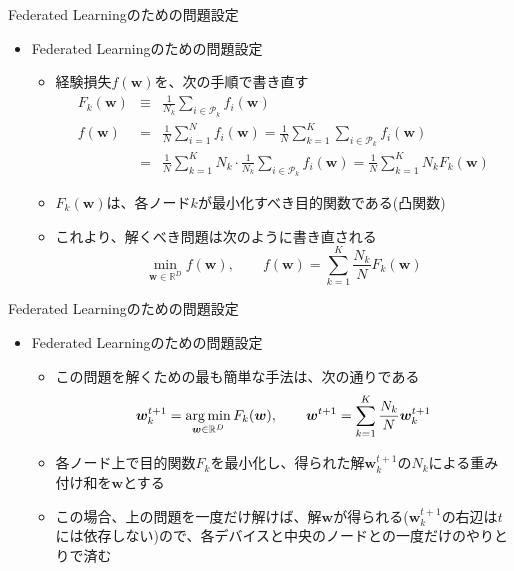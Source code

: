 \documentclass[dvipdfmx,notheorems,t]{beamer}
\begin{document}
\begin{frame}{Federated Learningのための問題設定}

\begin{itemize}
	\item Federated Learningのための問題設定
	\begin{itemize}
		\item 経験損失$f(\bm{w})$を、次の手順で書き直す
		\begin{eqnarray}
			F_k(\bm{w}) &\equiv& \frac{1}{N_k} \sum_{i \in \mathcal{P}_k} f_i(\bm{w}) \\
			f(\bm{w}) &=& \frac{1}{N} \sum_{i = 1}^N f_i(\bm{w}) = \frac{1}{N} \sum_{k = 1}^K \sum_{i \in \mathcal{P}_k} f_i(\bm{w}) \nonumber \\
			&=& \frac{1}{N} \sum_{k = 1}^K N_k \cdot \frac{1}{N_k} \sum_{i \in \mathcal{P}_k} f_i(\bm{w}) = \frac{1}{N} \sum_{k = 1}^K N_k F_k(\bm{w})
		\end{eqnarray}
		
		\item $F_k(\bm{w})$は、各ノード$k$が最小化すべき目的関数である(凸関数)
		\item これより、解くべき問題は次のように書き直される
		\begin{equation}
			\min_{\bm{w} \in \mathbb{R}^D} f(\bm{w}), \qquad f(\bm{w}) = \sum_{k = 1}^K \frac{N_k}{N} F_k(\bm{w})
		\end{equation}
	\end{itemize}
\end{itemize}

\end{frame}

\begin{frame}{Federated Learningのための問題設定}

\begin{itemize}
	\item Federated Learningのための問題設定
	\begin{itemize}
		\item この問題を解くための最も簡単な手法は、次の通りである
		\begin{equation}
			\bm{w}_k^{t + 1} = \operatorname*{arg\,min}_{\bm{w} \in \mathbb{R}^D} F_k(\bm{w}), \qquad \bm{w}^{t + 1} = \sum_{k = 1}^K \frac{N_k}{N} \bm{w}_k^{t + 1}
		\end{equation}
		
		\item 各ノード上で目的関数$F_k$を最小化し、得られた解$\bm{w}_k^{t + 1}$の$N_k$による重み付け和を$\bm{w}$とする
		\newline
		
		\item この場合、上の問題を一度だけ解けば、解$\bm{w}$が得られる($\bm{w}_k^{t + 1}$の右辺は$t$には依存しない)ので、各デバイスと中央のノードとの一度だけのやりとりで済む
	\end{itemize}
\end{itemize}

\end{frame}
\end{document}
